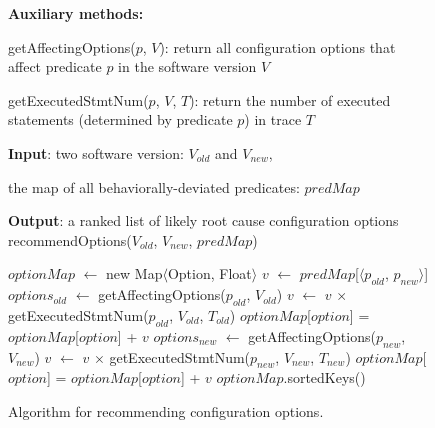
\begin{figure}[t]
\textbf{Auxiliary methods:}

\quad getAffectingOptions($\mathit{p}$, $\mathit{V}$): return all configuration options that affect predicate $\mathit{p}$ in the software version $\mathit{V}$

\quad getExecutedStmtNum($\mathit{p}$, $\mathit{V}$, $\mathit{T}$): return the number of executed statements (determined by predicate $\mathit{p}$) in trace $\mathit{T}$

\textbf{Input}: two software version: $\mathit{V_{old}}$ and $\mathit{V_{new}}$, 

\quad the map of all behaviorally-deviated predicates: $\mathit{predMap}$

\textbf{Output}: {a ranked list of likely root cause configuration options}
\vspace{-4mm}%
recommendOptions($\mathit{V_{old}}$, $\mathit{V_{new}}$, $\mathit{predMap}$)\\
\begin{algorithmic}[1]
\STATE $\mathit{optionMap}$ $\leftarrow$ new Map$\langle$Option, Float$\rangle$
\STATE $\mathit{v}$ $\leftarrow$ $\mathit{predMap}$[$\langle$$\mathit{p_{old}}$, $\mathit{p_{new}}$$\rangle$]
\STATE $\mathit{options_{old}}$ $\leftarrow$ getAffectingOptions($\mathit{p_{old}}$, $\mathit{V_{old}}$)
\STATE $\mathit{v}$ $\leftarrow$ $\mathit{v}$ $\times$ getExecutedStmtNum($\mathit{p_{old}}$, $\mathit{V_{old}}$, $\mathit{T_{old}}$)
\STATE $\mathit{optionMap}$[$\mathit{option}$] = $\mathit{optionMap}$[$\mathit{option}$] + $\mathit{v}$
\ENDFOR
\ENDIF
{}
\STATE $\mathit{options_{new}}$ $\leftarrow$ getAffectingOptions($\mathit{p_{new}}$, $\mathit{V_{new}}$)
\STATE $\mathit{v}$ $\leftarrow$ $\mathit{v}$ $\times$ getExecutedStmtNum($\mathit{p_{new}}$, $\mathit{V_{new}}$, $\mathit{T_{new}}$)
\STATE $\mathit{optionMap}$[$\mathit{option}$] = $\mathit{optionMap}$[$\mathit{option}$] + $\mathit{v}$
\ENDFOR
\ENDIF
\ENDFOR
\RETURN $\mathit{optionMap}$.sortedKeys()
\vspace{-2mm}
\end{algorithmic}
\caption{Algorithm for recommending configuration options.
\label{fig:recommend}
}
\end{figure}
